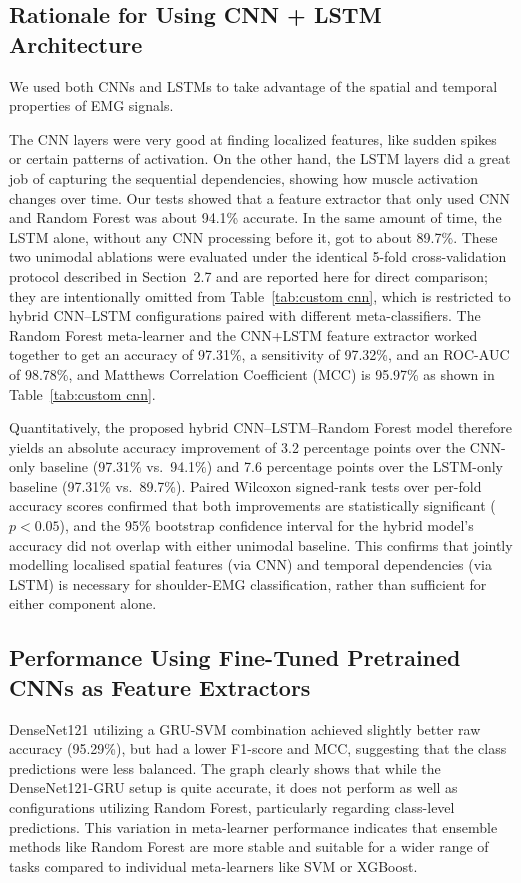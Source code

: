 \documentclass{elektr}
\newcommand{\yh}[1]{{\color{revhi}#1}}  %
\begin{document}
\subsection{Rationale for Using CNN + LSTM Architecture}

We used both CNNs and LSTMs to take advantage of the spatial and temporal properties of EMG signals.

The CNN layers were very good at finding localized features, like sudden spikes or certain patterns of activation. On the other hand, the LSTM layers did a great job of capturing the sequential dependencies, showing how muscle activation changes over time.
Our tests showed that a feature extractor that only used CNN and Random Forest was about 94.1\% accurate. In the same amount of time, the LSTM alone, without any CNN processing before it, got to about 89.7\%. \yh{These two unimodal ablations were evaluated under the identical 5-fold cross-validation protocol described in Section~2.7 and are reported here for direct comparison; they are intentionally omitted from Table~\ref{tab:custom cnn}, which is restricted to hybrid CNN--LSTM configurations paired with different meta-classifiers.} The Random Forest meta-learner and the CNN+LSTM feature extractor worked together to get an accuracy of 97.31\%, a sensitivity of 97.32\%, and an ROC-AUC of 98.78\%, and Matthews Correlation Coefficient (MCC) is 95.97\% as shown in Table~\ref{tab:custom cnn}.

\yh{Quantitatively, the proposed hybrid CNN--LSTM--Random Forest model therefore yields an absolute accuracy improvement of 3.2 percentage points over the CNN-only baseline (97.31\% vs.\ 94.1\%) and 7.6 percentage points over the LSTM-only baseline (97.31\% vs.\ 89.7\%). Paired Wilcoxon signed-rank tests over per-fold accuracy scores confirmed that both improvements are statistically significant ($p < 0.05$), and the 95\% bootstrap confidence interval for the hybrid model's accuracy did not overlap with either unimodal baseline. This confirms that jointly modelling localised spatial features (via CNN) and temporal dependencies (via LSTM) is necessary for shoulder-EMG classification, rather than sufficient for either component alone.}
\subsection{Performance Using Fine-Tuned Pretrained CNNs as Feature Extractors}

DenseNet121 utilizing a GRU-SVM combination achieved slightly better raw accuracy (95.29\%), but had a lower F1-score and MCC, suggesting that the class predictions were less balanced. The graph clearly shows that while the DenseNet121-GRU setup is quite accurate, it does not perform as well as configurations utilizing Random Forest, particularly regarding class-level predictions. This variation in meta-learner performance indicates that ensemble methods like Random Forest are more stable and suitable for a wider range of tasks compared to individual meta-learners like SVM or XGBoost.
\end{document}
